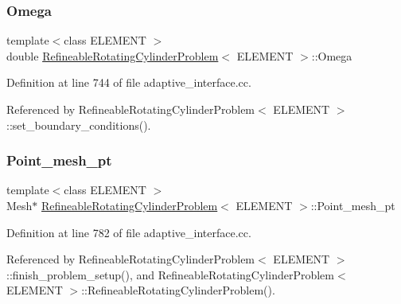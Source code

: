 \mbox{\label{classRefineableRotatingCylinderProblem_aaf1d39e57b4fc4d470b69f01121d93a3}} 
\subsubsection{\texorpdfstring{Omega}{Omega}}
{\footnotesize\ttfamily template$<$class E\+L\+E\+M\+E\+NT $>$ \\
double \hyperlink{classRefineableRotatingCylinderProblem}{Refineable\+Rotating\+Cylinder\+Problem}$<$ E\+L\+E\+M\+E\+NT $>$\+::Omega}



Definition at line 744 of file adaptive\+\_\+interface.\+cc.



Referenced by Refineable\+Rotating\+Cylinder\+Problem$<$ E\+L\+E\+M\+E\+N\+T $>$\+::set\+\_\+boundary\+\_\+conditions().

\mbox{\label{classRefineableRotatingCylinderProblem_af438026e310576c522706dbff92ee750}} 
\subsubsection{\texorpdfstring{Point\+\_\+mesh\+\_\+pt}{Point\_mesh\_pt}}
{\footnotesize\ttfamily template$<$class E\+L\+E\+M\+E\+NT $>$ \\
Mesh$\ast$ \hyperlink{classRefineableRotatingCylinderProblem}{Refineable\+Rotating\+Cylinder\+Problem}$<$ E\+L\+E\+M\+E\+NT $>$\+::Point\+\_\+mesh\+\_\+pt}



Definition at line 782 of file adaptive\+\_\+interface.\+cc.



Referenced by Refineable\+Rotating\+Cylinder\+Problem$<$ E\+L\+E\+M\+E\+N\+T $>$\+::finish\+\_\+problem\+\_\+setup(), and Refineable\+Rotating\+Cylinder\+Problem$<$ E\+L\+E\+M\+E\+N\+T $>$\+::\+Refineable\+Rotating\+Cylinder\+Problem().

